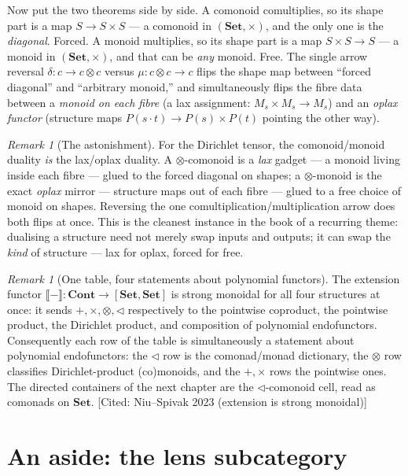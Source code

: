 \documentclass[11pt,a4paper]{book}
\newcommand{\Set}{\mathbf{Set}}
\newcommand{\Cont}{\mathbf{Cont}}
\newcommand{\Ext}[1]{\llbracket #1 \rrbracket}
\theoremstyle{plain}
\theoremstyle{definition}
\theoremstyle{remark}
\newtheorem{Remark}[Theorem]{Remark}
\newcommand{\prov}[1]{\hfill\textsf{\footnotesize[#1]}}
\begin{document}
Now put the two theorems side by side. A comonoid comultiplies, so its shape part
is a map $S\to S\times S$ --- a comonoid in $(\Set,\times)$, and the only one is
the \emph{diagonal}. Forced. A monoid multiplies, so its shape part is a map
$S\times S\to S$ --- a monoid in $(\Set,\times)$, and that can be \emph{any}
monoid. Free. The single arrow reversal $\delta\colon c\to c\otimes c$ versus
$\mu\colon c\otimes c\to c$ flips the shape map between ``forced diagonal'' and
``arbitrary monoid,'' and simultaneously flips the fibre data between a
\emph{monoid on each fibre} (a lax assignment: $M_s\times M_s\to M_s$) and an
\emph{oplax functor} (structure maps $P(s\cdot t)\to P(s)\times P(t)$ pointing the
other way).

\begin{Remark}[The astonishment]
For the Dirichlet tensor, the comonoid/monoid duality \emph{is} the lax/oplax
duality. A $\otimes$-comonoid is a \emph{lax} gadget --- a monoid living inside
each fibre --- glued to the forced diagonal on shapes; a $\otimes$-monoid is the
exact \emph{oplax} mirror --- structure maps out of each fibre --- glued to a free
choice of monoid on shapes. Reversing the one comultiplication/multiplication
arrow does both flips at once. This is the cleanest instance in the book of a
recurring theme: dualising a structure need not merely swap inputs and outputs; it
can swap the \emph{kind} of structure --- lax for oplax, forced for free.
\end{Remark}

\begin{Remark}[One table, four statements about polynomial functors]
The extension functor $\Ext{-}\colon\Cont\to[\Set,\Set]$ is strong monoidal for
all four structures at once: it sends $+,\times,\otimes,\triangleleft$
respectively to the pointwise coproduct, the pointwise product, the Dirichlet
product, and composition of polynomial endofunctors. Consequently each row of the
table is simultaneously a statement about polynomial endofunctors: the
$\triangleleft$ row is the comonad/monad dictionary, the $\otimes$ row classifies
Dirichlet-product (co)monoids, and the $+,\times$ rows the pointwise ones. The
directed containers of the next chapter are the $\triangleleft$-comonoid cell,
read as comonads on $\Set$.
\prov{Cited: Niu--Spivak 2023 (extension is strong monoidal)}
\end{Remark}

\section{An aside: the lens subcategory}
\label{sec:lens-subcat}
\end{document}
